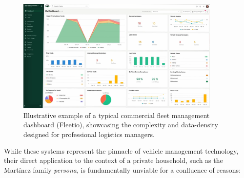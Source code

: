 \begin{figure}[h!]
    \centering
    \includegraphics[width=0.9\textwidth]{images/background/fleetio.png}
    \caption{Illustrative example of a typical commercial fleet management dashboard (Fleetio), showcasing the complexity and data-density designed for professional logistics managers.}
\end{figure}

\textgap

While these systems represent the pinnacle of vehicle management technology, their direct application to the context of a private household, such as the Martínez family \textit{persona}, is fundamentally unviable for a confluence of reasons:

